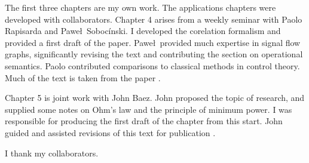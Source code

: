 The first three chapters are my own work. The applications chapters were
developed with collaborators. Chapter 4 arises from a weekly seminar with Paolo
Rapisarda and Pawe\l\ Soboc\'inski. I developed the corelation formalism and provided a
first draft of the paper. Pawe\l\ provided much expertise in signal flow graphs,
significantly revising the text and contributing the section on operational
semantics. Paolo contributed comparisons to classical methods in control theory. 
Much of the text is taken from the paper \cite{FonRapSob16}.

Chapter 5 is joint work with John Baez. John proposed the topic of research, and
supplied some notes on Ohm's law and the principle of minimum power. I
was responsible for producing the first draft of the chapter from this start.
John guided and assisted revisions of this text for publication \cite{BaeFon16}.

I thank my collaborators.
